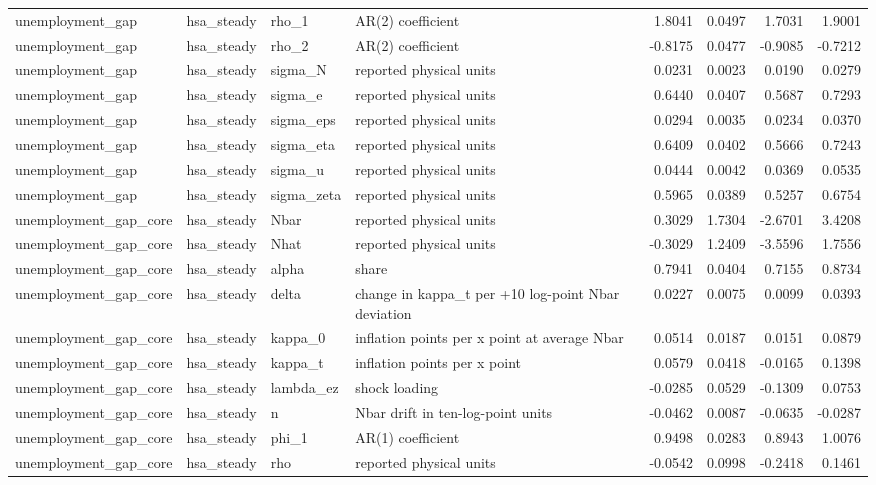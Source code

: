 \begin{tabular}{llllrrrr}
unemployment\_gap & hsa\_steady & rho\_1 & AR(2) coefficient & 1.8041 & 0.0497 & 1.7031 & 1.9001 \\
unemployment\_gap & hsa\_steady & rho\_2 & AR(2) coefficient & -0.8175 & 0.0477 & -0.9085 & -0.7212 \\
unemployment\_gap & hsa\_steady & sigma\_N & reported physical units & 0.0231 & 0.0023 & 0.0190 & 0.0279 \\
unemployment\_gap & hsa\_steady & sigma\_e & reported physical units & 0.6440 & 0.0407 & 0.5687 & 0.7293 \\
unemployment\_gap & hsa\_steady & sigma\_eps & reported physical units & 0.0294 & 0.0035 & 0.0234 & 0.0370 \\
unemployment\_gap & hsa\_steady & sigma\_eta & reported physical units & 0.6409 & 0.0402 & 0.5666 & 0.7243 \\
unemployment\_gap & hsa\_steady & sigma\_u & reported physical units & 0.0444 & 0.0042 & 0.0369 & 0.0535 \\
unemployment\_gap & hsa\_steady & sigma\_zeta & reported physical units & 0.5965 & 0.0389 & 0.5257 & 0.6754 \\
unemployment\_gap\_core & hsa\_steady & Nbar & reported physical units & 0.3029 & 1.7304 & -2.6701 & 3.4208 \\
unemployment\_gap\_core & hsa\_steady & Nhat & reported physical units & -0.3029 & 1.2409 & -3.5596 & 1.7556 \\
unemployment\_gap\_core & hsa\_steady & alpha & share & 0.7941 & 0.0404 & 0.7155 & 0.8734 \\
unemployment\_gap\_core & hsa\_steady & delta & change in kappa\_t per +10 log-point Nbar deviation & 0.0227 & 0.0075 & 0.0099 & 0.0393 \\
unemployment\_gap\_core & hsa\_steady & kappa\_0 & inflation points per x point at average Nbar & 0.0514 & 0.0187 & 0.0151 & 0.0879 \\
unemployment\_gap\_core & hsa\_steady & kappa\_t & inflation points per x point & 0.0579 & 0.0418 & -0.0165 & 0.1398 \\
unemployment\_gap\_core & hsa\_steady & lambda\_ez & shock loading & -0.0285 & 0.0529 & -0.1309 & 0.0753 \\
unemployment\_gap\_core & hsa\_steady & n & Nbar drift in ten-log-point units & -0.0462 & 0.0087 & -0.0635 & -0.0287 \\
unemployment\_gap\_core & hsa\_steady & phi\_1 & AR(1) coefficient & 0.9498 & 0.0283 & 0.8943 & 1.0076 \\
unemployment\_gap\_core & hsa\_steady & rho & reported physical units & -0.0542 & 0.0998 & -0.2418 & 0.1461 \\

\end{tabular}
